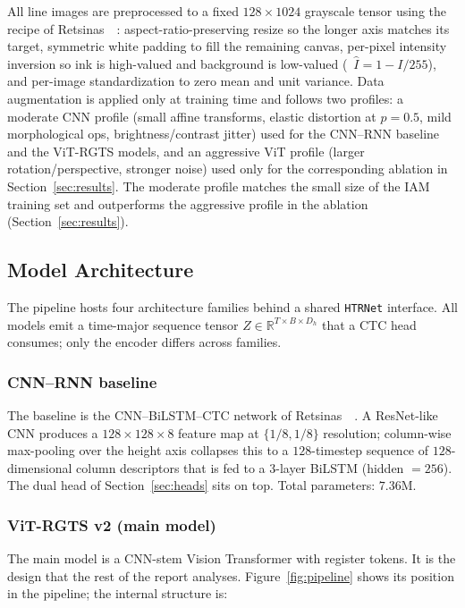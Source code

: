 All line images are preprocessed to a fixed $128 \times 1024$ grayscale tensor using the recipe of Retsinas~\etal~\cite{retsinas2022htrbestpractices}: aspect-ratio-preserving resize so the longer axis matches its target, symmetric white padding to fill the remaining canvas, per-pixel intensity inversion so ink is high-valued and background is low-valued (\ie\ $\hat I = 1 - I/255$), and per-image standardization to zero mean and unit variance. Data augmentation is applied only at training time and follows two profiles: a moderate CNN profile (small affine transforms, elastic distortion at $p=0.5$, mild morphological ops, brightness/contrast jitter) used for the CNN--RNN baseline and the ViT-RGTS models, and an aggressive ViT profile (larger rotation/perspective, stronger noise) used only for the corresponding ablation in Section~\ref{sec:results}. The moderate profile matches the small size of the IAM training set and outperforms the aggressive profile in the ablation (Section~\ref{sec:results}).

\subsection{Model Architecture}
\label{sec:arch}

The pipeline hosts four architecture families behind a shared \texttt{HTRNet} interface. All models emit a time-major sequence tensor $Z \in \mathbb{R}^{T \times B \times D_h}$ that a CTC head consumes; only the encoder differs across families.

\subsubsection{CNN--RNN baseline}

The baseline is the CNN--BiLSTM--CTC network of Retsinas~\etal~\cite{retsinas2022htrbestpractices}. A ResNet-like CNN produces a $128 \times 128 \times 8$ feature map at $\{1/8, 1/8\}$ resolution; column-wise max-pooling over the height axis collapses this to a $128$-timestep sequence of $128$-dimensional column descriptors that is fed to a $3$-layer BiLSTM (hidden $= 256$). The dual head of Section~\ref{sec:heads} sits on top. Total parameters: $7.36$M.

\subsubsection{ViT-RGTS v2 (main model)}

The main model is a CNN-stem Vision Transformer with register tokens. It is the design that the rest of the report analyses. Figure~\ref{fig:pipeline} shows its position in the pipeline; the internal structure is:

